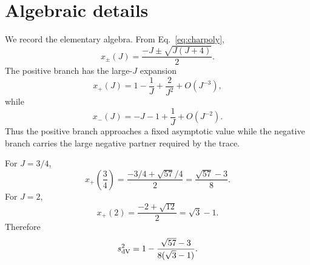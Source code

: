 \section{Algebraic details}
\label{app:algebra}

We record the elementary algebra.  From Eq.~\eqref{eq:charpoly},
\begin{equation}
  x_\pm(J)=\frac{-J\pm\sqrt{J(J+4)}}{2}.
\end{equation}
The positive branch has the large-\(J\) expansion
\begin{equation}
  x_+(J)=1-\frac{1}{J}+\frac{2}{J^2}+O(J^{-3}),
\end{equation}
while
\begin{equation}
  x_-(J)=-J-1+\frac{1}{J}+O(J^{-2}).
\end{equation}
Thus the positive branch approaches a fixed asymptotic value while the negative branch carries the large negative partner required by the trace.

For \(J=3/4\),
\begin{equation}
  x_+\left(\frac34\right)=\frac{-3/4+\sqrt{57}/4}{2}=\frac{\sqrt{57}-3}{8}.
\end{equation}
For \(J=2\),
\begin{equation}
  x_+(2)=\frac{-2+\sqrt{12}}{2}=\sqrt{3}-1.
\end{equation}
Therefore
\begin{equation}
  s^2_{\rm dV}=1-\frac{\sqrt{57}-3}{8(\sqrt3-1)}.
\end{equation}
